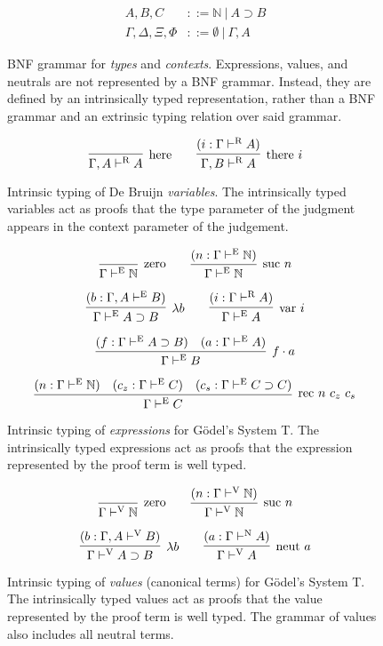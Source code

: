 \documentclass{llncs}
\def\arr{\supset}
\def\app{\cdot}
\def\lam{\lambda}
\def\nat{\mathbb{N}}
\def\emp{\emptyset}
\newcommand{\turn}[1]{\vdash^\con{#1}}
\newcommand{\con}[1]{\textmd{#1}}
\newcommand{\fun}[1]{\textmd{#1}}
\newcommand{\type}[1]{\Gamma \turn{E} #1}
\newcommand{\ctype}[2]{\Gamma , #1 \turn{E} #2}
\newcommand{\typv}[1]{\Gamma \turn{V} #1}
\newcommand{\ctypv}[2]{\Gamma , #1 \turn{V} #2}
\newcommand{\typn}[1]{\Gamma \turn{N} #1}
\newcommand{\typr}[1]{\Gamma \turn{R} #1}
\newcommand{\ctypr}[2]{\Gamma , #1 \turn{R} #2}
\begin{document}
\clearpage

\begin{figure}
\caption{
BNF grammar for \textit{types} and \textit{contexts}. 
Expressions, values, and neutrals
are not represented by a BNF grammar. Instead, they are defined by
an intrinsically typed representation, rather than a BNF grammar and
an extrinsic typing relation over said grammar.
}
\begin{align*}
A, B, C &::= \nat ~ | ~ A \arr B \\
\Gamma, \Delta, \Xi, \Phi &::= \emp ~ | ~ \Gamma , A
\end{align*}
\label{fig:gram}
\end{figure}

\begin{figure}
\caption{
Intrinsic typing of De Bruijn \textit{variables}.
The intrinsically typed variables act as proofs that the type
parameter of the judgment appears in the context parameter of the
judgement.
}
$$
\infer
  [\con{here}]
  {\ctypr{A}{A}}
{
}
\qquad
\infer
  [\con{there} ~ i]
  {\ctypr{B}{A}}
{
  (i : \typr{A})
}
$$
\label{fig:typr}
\end{figure}

\begin{figure}
\caption{
Intrinsic typing of \textit{expressions} for G{\"o}del's System T. The
intrinsically typed expressions act as proofs that the expression
represented by the proof term is well typed.
}
$$
\infer
  [\con{zero}]
  {\type{\nat}}
{}
\qquad
\infer
  [\con{suc} ~ n]
  {\type{\nat}}
{
  (n : \type{\nat})
}
$$

$$
\infer
  [\lam b]
  {\type{A \arr B}}
{
  (b : \ctype{A}{B})
}
\qquad
\infer
  [\fun{var} ~ i]
  {\type{A}}
{
  (i : \typr{A})
}
$$

$$
\infer
  [f \app a]
  {\type{B}}
{
  (f : \type{A \arr B})
  &
  (a : \type{A})
}
$$

$$
\infer
  [\fun{rec} ~ n ~ c_z ~ c_s]
  {\type{C}}
{
  (n : \type{\nat})
  &
  (c_z : \type{C})
  &
  (c_s : \type{C \arr C})
}
$$
\label{fig:type}
\end{figure}

\begin{figure}
\caption{
Intrinsic typing of \textit{values} (canonical terms) for G{\"o}del's System T.
The intrinsically typed values act as proofs that the value
represented by the proof term is well typed. The grammar of values
also includes all neutral terms.
}
$$
\infer
  [\con{zero}]
  {\typv{\nat}}
{}
\qquad
\infer
  [\con{suc} ~ n]
  {\typv{\nat}}
{
  (n : \typv{\nat})
}
$$

$$
\infer
  [\lam b]
  {\typv{A \arr B}}
{
  (b : \ctypv{A}{B})
}
\qquad
\infer
  [\fun{neut} ~ a]
  {\typv{A}}
{
  (a : \typn{A})
}
$$
\label{fig:typv}
\end{figure}
\end{document}
